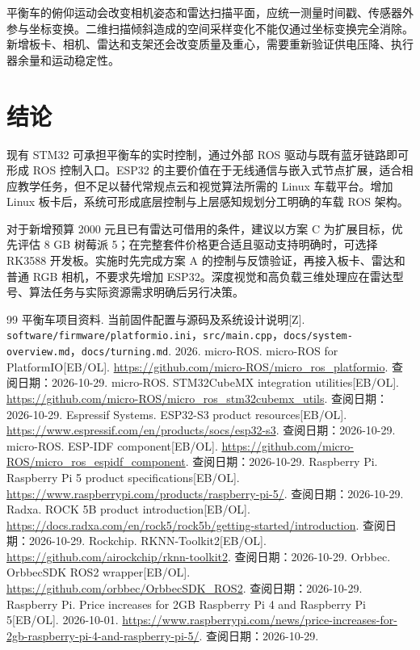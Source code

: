 \documentclass[UTF8,fontset=none,a4paper,11pt]{ctexart}
\newcommand{\code}[1]{\texttt{#1}}
\begin{document}
平衡车的俯仰运动会改变相机姿态和雷达扫描平面，应统一测量时间戳、传感器外参与坐标变换。二维扫描倾斜造成的空间采样变化不能仅通过坐标变换完全消除。新增板卡、相机、雷达和支架还会改变质量及重心，需要重新验证供电压降、执行器余量和运动稳定性。

\section{结论}
现有 STM32 可承担平衡车的实时控制，通过外部 ROS 驱动与既有蓝牙链路即可形成 ROS 控制入口。ESP32 的主要价值在于无线通信与嵌入式节点扩展，适合相应教学任务，但不足以替代常规点云和视觉算法所需的 Linux 车载平台。增加 Linux 板卡后，系统可形成底层控制与上层感知规划分工明确的车载 ROS 架构。

对于新增预算 2000 元且已有雷达可借用的条件，建议以方案 C 为扩展目标，优先评估 8 GB 树莓派 5；在完整套件价格更合适且驱动支持明确时，可选择 RK3588 开发板。实施时先完成方案 A 的控制与反馈验证，再接入板卡、雷达和普通 RGB 相机，不要求先增加 ESP32。深度视觉和高负载三维处理应在雷达型号、算法任务与实际资源需求明确后另行决策。

\begin{thebibliography}{99}
\small
{} 平衡车项目资料. 当前固件配置与源码及系统设计说明[Z]. \code{software/firmware/platformio.ini}，\code{src/main.cpp}，\code{docs/system-overview.md}，\code{docs/turning.md}. 2026.
 micro-ROS. micro-ROS for PlatformIO[EB/OL]. \url{https://github.com/micro-ROS/micro_ros_platformio}. 查阅日期：2026-10-29.
 micro-ROS. STM32CubeMX integration utilities[EB/OL]. \url{https://github.com/micro-ROS/micro_ros_stm32cubemx_utils}. 查阅日期：2026-10-29.
 Espressif Systems. ESP32-S3 product resources[EB/OL]. \url{https://www.espressif.com/en/products/socs/esp32-s3}. 查阅日期：2026-10-29.
 micro-ROS. ESP-IDF component[EB/OL]. \url{https://github.com/micro-ROS/micro_ros_espidf_component}. 查阅日期：2026-10-29.
 Raspberry Pi. Raspberry Pi 5 product specifications[EB/OL]. \url{https://www.raspberrypi.com/products/raspberry-pi-5/}. 查阅日期：2026-10-29.
 Radxa. ROCK 5B product introduction[EB/OL]. \url{https://docs.radxa.com/en/rock5/rock5b/getting-started/introduction}. 查阅日期：2026-10-29.
 Rockchip. RKNN-Toolkit2[EB/OL]. \url{https://github.com/airockchip/rknn-toolkit2}. 查阅日期：2026-10-29.
 Orbbec. OrbbecSDK ROS2 wrapper[EB/OL]. \url{https://github.com/orbbec/OrbbecSDK_ROS2}. 查阅日期：2026-10-29.
 Raspberry Pi. Price increases for 2GB Raspberry Pi 4 and Raspberry Pi 5[EB/OL]. 2026-10-01. \url{https://www.raspberrypi.com/news/price-increases-for-2gb-raspberry-pi-4-and-raspberry-pi-5/}. 查阅日期：2026-10-29.
\end{thebibliography}
\end{document}
